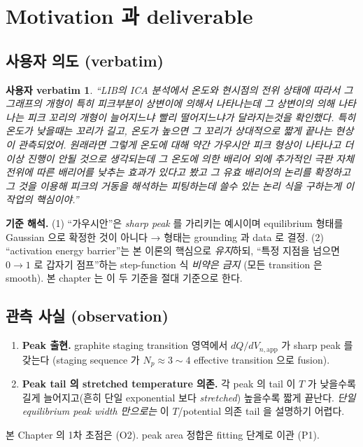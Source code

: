 \documentclass[11pt,a4paper]{article}
\newtheorem*{uservb}{사용자 verbatim}
\newcommand{\app}{\mathrm{app}}
\begin{document}
\tableofcontents
\newpage

\section{Motivation 과 deliverable}\label{sec:intro}

\subsection{사용자 의도 (verbatim)}\label{sec:verbatim}
\begin{uservb}
``LIB의 ICA 분석에서 온도와 현시점의 전위 상태에 따라서 그 그래프의 개형이 특히
피크부분이 상변이에 의해서 나타나는데 그 상변이의 의해 나타나는 피크 꼬리의 개형이
늘어지느냐 빨리 떨어지느냐가 달라지는것을 확인했다. 특히 온도가 낮을때는 꼬리가
길고, 온도가 높으면 그 꼬리가 상대적으로 짧게 끝나는 현상이 관측되었어. 원래라면
그렇게 온도에 대해 약간 가우시안 피크 형상이 나타나고 더이상 진행이 안될 것으로
생각되는데 그 온도에 의한 배리어 외에 추가적인 극판 자체 전위에 따른 배리어를
낮추는 효과가 있다고 봤고 그 유효 배리어의 논리를 확정하고 그 것을 이용해 피크의
거동을 해석하는 피팅하는데 쓸수 있는 논리 식을 구하는게 이 작업의 핵심이야.''
\end{uservb}

\textbf{기준 해석.} (1) ``가우시안''은 \emph{sharp peak} 를 가리키는
예시이며 equilibrium 형태를 Gaussian 으로 확정한 것이 아니다 → 형태는 grounding 과 data
로 결정. (2) ``activation energy barrier''는 본 이론의 핵심으로 \emph{유지}하되, ``특정
지점을 넘으면 $0\!\to\!1$ 로 갑자기 점프''하는 step-function 식 \emph{비약은 금지} (모든
transition 은 smooth). 본 chapter 는 이 두 기준을 절대 기준으로 한다.

\subsection{관측 사실 (observation)}\label{sec:observation}
\begin{enumerate}[label=\textbf{(O\arabic*)}]
\item \textbf{Peak 출현.} graphite staging transition 영역에서 $dQ/dV_{n,\app}$ 가 sharp
  peak 를 갖는다 (staging sequence 가 $N_p\approx3\sim4$ effective transition 으로 fusion).
\item \textbf{Peak tail 의 stretched temperature 의존.} 각 peak 의 tail 이 $T$ 가
  낮을수록 길게 늘어지고(흔히 단일 exponential 보다 \emph{stretched}) 높을수록 짧게
  끝난다. \emph{단일 equilibrium peak width 만으로는} 이 $T$/potential 의존 tail 을
  설명하기 어렵다.
\end{enumerate}
본 Chapter 의 1차 초점은 (O2). peak area 정합은 fitting 단계로 이관 (P1).
\end{document}
